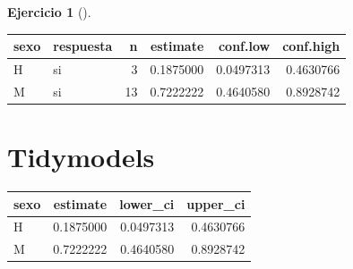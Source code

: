 \documentclass[
  a4paper,
]{scrreport}
\newenvironment{Shaded}{\begin{snugshade}}{\end{snugshade}}
\newcommand{\AttributeTok}[1]{\textcolor[rgb]{0.40,0.45,0.13}{#1}}
\newcommand{\FunctionTok}[1]{\textcolor[rgb]{0.28,0.35,0.67}{#1}}
\newcommand{\NormalTok}[1]{\textcolor[rgb]{0.00,0.23,0.31}{#1}}
\newcommand{\SpecialCharTok}[1]{\textcolor[rgb]{0.37,0.37,0.37}{#1}}
\newcommand{\StringTok}[1]{\textcolor[rgb]{0.13,0.47,0.30}{#1}}
\theoremstyle{definition}
\newtheorem{exercise}{Ejercicio}[chapter]
\theoremstyle{remark}
\begin{document}
\begin{exercise}[]
\begin{enumerate}
\begin{tcolorbox}
  \begin{longtable}[]{@{}llrrrr@{}}
  \toprule\noalign{}
  sexo & respuesta & n & estimate & conf.low & conf.high \\
  \midrule\noalign{}
  \endhead
  \bottomrule\noalign{}
  \endlastfoot
  H & si & 3 & 0.1875000 & 0.0497313 & 0.4630766 \\
  M & si & 13 & 0.7222222 & 0.4640580 & 0.8928742 \\
  \end{longtable}

  \section{Tidymodels}

\begin{Shaded}
\end{Shaded}

  \begin{longtable}[]{@{}lrrr@{}}
  \toprule\noalign{}
  sexo & estimate & lower\_ci & upper\_ci \\
  \midrule\noalign{}
  \endhead
  \bottomrule\noalign{}
  \endlastfoot
  H & 0.1875000 & 0.0497313 & 0.4630766 \\
  M & 0.7222222 & 0.4640580 & 0.8928742 \\
  \end{longtable}


\end{tcolorbox}
\end{enumerate}
\end{exercise}
\end{document}
